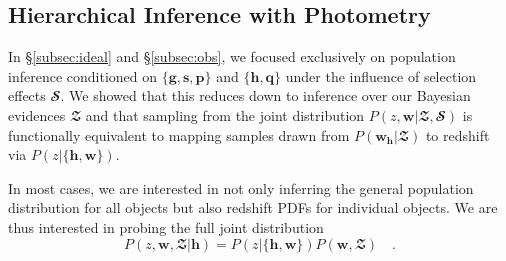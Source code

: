 \documentclass[a4paper,fleqn,usenatbib,english]{mnras}
\begin{document}


\subsection{Hierarchical Inference with Photometry}
\label{subsec:hier}

In \S\ref{subsec:ideal} and \S\ref{subsec:obs}, we focused exclusively on population inference conditioned on $\lbrace \mathbf{g}, \mathbf{s}, \mathbf{p} \rbrace$ and $\lbrace \mathbf{h}, \mathbf{q} \rbrace$ under the influence of selection effects $\mathbfcal{S}$. We showed that this reduces down to inference over our Bayesian evidences $\mathbfcal{Z}$ and that sampling from the joint distribution $P(z,\mathbf{w}|\mathbfcal{Z},\mathbfcal{S})$ is functionally equivalent to mapping samples drawn from $P(\mathbf{w_h}|\mathbfcal{Z})$ to redshift via $P(z|\lbrace \mathbf{h}, \mathbf{w} \rbrace)$.

In most cases, we are interested in not only inferring the general population distribution for all objects but also redshift PDFs for individual objects. We are thus interested in probing the full joint distribution
\begin{equation}\label{eq:hier_full}
P(z, \mathbf{w},\mathbfcal{Z} | \mathbf{h}) = P(z|\lbrace \mathbf{h}, \mathbf{w} \rbrace) P(\mathbf{w},\mathbfcal{Z}) \quad .
\end{equation}
\end{document}
